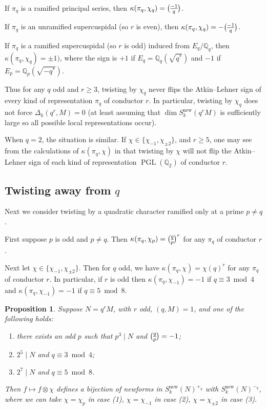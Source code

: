 \documentclass[11pt]{amsart}
\newcommand{\Q}{\mathbb Q}
\newcommand{\new}{\mathrm{new}}
\renewcommand{\mod}{\bmod}
\newcommand{\leg}{\overwithdelims ()}
\DeclareMathOperator{\PGL}{PGL}
\numberwithin{lem}{section}
\newtheorem{prop}[lem]{Proposition}
\theoremstyle{remark}
\theoremstyle{definition}
\numberwithin{equation}{section}
\begin{document}
If $\pi_q$ is a ramified principal series, then $\kappa(\pi_q, \chi_q) = {-1 \leg q}$.

If $\pi_q$ is an unramified supercuspidal (so $r$ is even), then $\kappa(\pi_q, \chi_q) = -{-1 \leg q}$.

If $\pi_q$ is a ramified supercuspidal (so $r$ is odd) induced from $E_q/\Q_q$, then $\kappa(\pi_q, \chi_q) = \pm 1)$, where the sign is $+1$ if $E_q = \Q_q(\sqrt {q^*})$ and $-1$ if  $E_p = \Q_p(\sqrt {-q^*})$.

Thus for any $q$ odd and $r \ge 3$, twisting by $\chi_q$ never flips the Atkin--Lehner sign of every kind of representation $\pi_q$ of conductor $r$.  In particular, twisting by $\chi_q$ does not force $\Delta_k(q^r, M) = 0$ (at least assuming that $\dim S_k^\new(q^r M)$ is sufficiently large so all possible local representations occur). 

When $q=2$, the situation is similar.  If $\chi \in \{ \chi_{-1}, \chi_{\pm 2} \}$, 
and $r \ge 5$, one may see from the calculations of $\kappa(\pi_q, \chi)$ in \cite[Theorem 4.2]{pacetti} that twisting by $\chi$ will not flip the Atkin--Lehner sign of each kind of representation $\PGL(\Q_2)$ of conductor $r$.

\subsection{Twisting away from $q$}
Next we consider twisting by a quadratic character ramified only at a prime $p \ne q$.

First suppose $p$ is odd and $p \ne q$.  Then $\kappa(\pi_q, \chi_p) = {q \leg p}^{r}$ for any $\pi_q$ of conductor $r$.

Next let $\chi \in \{ \chi_{-1}, \chi_{\pm 2} \}$.  Then for $q$ odd, we have $\kappa(\pi_q, \chi) = \chi(q)^r$ for any $\pi_q$ of conductor $r$.  In particular, if $r$ is odd then $\kappa(\pi_q, \chi_{-1}) = -1$ if $q \equiv 3 \mod 4$ and $\kappa(\pi_q, \chi_{-1}) = -1$ if $q \equiv 5 \mod 8$.

\begin{prop} \label{prop:quadtwist}
Suppose $N = q^r M$, with $r$ odd, $(q,M) = 1$, and one of the following holds:
\begin{enumerate}
\item there exists an odd $p$ such that $p^3 \mid N$ and ${q \leg p} = -1$;
\item $2^5 \mid N$ and $q \equiv 3 \mod 4$; 
\item $2^7 \mid N$ and $q \equiv 5 \mod 8$.
\end{enumerate}
Then $f \mapsto f \otimes \chi$ defines a bijection of newforms in $S^\new_k(N)^{+_q}$ with $S^\new_k(N)^{-_q}$, where we can take $\chi = \chi_p$ in case (1), $\chi = \chi_{-1}$ in case (2), $\chi = \chi_{\pm 2}$ in case (3).
\end{prop}
\end{document}
